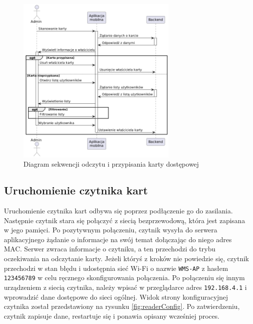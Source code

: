 \begin{figure}[H]
    \centering
    \includegraphics[width=0.7\textwidth]{graf/cardSeq.png}
    \caption{Diagram sekwencji odczytu i przypisania karty dostępowej}
    \label{fig:assignCard}
\end{figure}

\subsection{Uruchomienie czytnika kart}

Uruchomienie czytnika kart odbywa się poprzez podłączenie go do zasilania. Następnie czytnik stara się połączyć z siecią bezprzewodową, która jest zapisana w jego pamięci. Po pozytywnym połączeniu, czytnik wysyła do serwera aplikacyjnego żądanie o informacje na swój temat dołączając do niego adres MAC. Serwer zwraca informacje o czytniku, a ten przechodzi do trybu oczekiwania na odczytanie karty. Jeżeli któryś z kroków nie powiedzie się, czytnik przechodzi w stan błędu i udostępnia sieć Wi-Fi o nazwie \texttt{WMS-AP} z hasłem \texttt{123456789} w celu ręcznego skonfigurowania połączenia. Po połączeniu się innym urządzeniem z siecią czytnika, należy wpisać w przeglądarce adres \texttt{192.168.4.1} i wprowadzić dane dostępowe do sieci ogólnej. Widok strony konfiguracyjnej czytnika został przedstawiony na rysunku \ref{fig:readerConfig}. Po zatwierdzeniu, czytnik zapisuje dane, restartuje się i ponawia opisany wcześniej proces.

